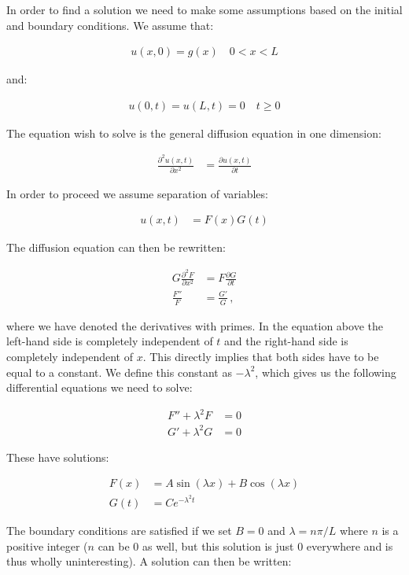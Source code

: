 \documentclass[reprint,english,notitlepage]{revtex4-1}  %
\begin{document}
In order to find a solution we need to make some assumptions based on the initial and boundary conditions. We assume that:

\begin{align*}
u(x,0) = g(x) \quad 0 < x < L
\end{align*}

and:

\begin{align*}
u(0,t) = u(L,t) = 0 \quad t \geq 0
\end{align*}

The equation wish to solve is the general diffusion equation in one dimension:

\begin{align*}
\frac{\partial^2 u(x,t)}{\partial x^2} &= \frac{\partial u(x,t)}{\partial t}
\end{align*}

In order to proceed we assume separation of variables:

\begin{align*}
u(x,t) &= F(x)G(t) 
\end{align*}

The diffusion equation can then be rewritten:

\begin{align*}
G \frac{\partial^2 F}{\partial x^2} &= F \frac{\partial G}{\partial t} \\
\frac{F''}{F} &= \frac{G'}{G} \, ,
\end{align*}

where we have denoted the derivatives with primes. In the equation above the left-hand side is completely independent of $t$ and the right-hand side is completely independent of $x$. This directly implies that both sides have to be equal to a constant. We define this constant as $-\lambda^2$, which gives us the following differential equations we need to solve:

\begin{align*}
F'' + \lambda^2 F &= 0 \\
G' + \lambda^2 G &= 0
\end{align*}

These have solutions:

\begin{align*}
F(x) &= A \sin (\lambda x) + B \cos ( \lambda x) \\
G(t) &= Ce^{-\lambda^2 t}
\end{align*}

The boundary conditions are satisfied if we set $B = 0$ and $\lambda = n\pi /L$ where $n$ is a positive integer ($n$ can be 0 as well, but this solution is just 0 everywhere and is thus wholly uninteresting). A solution can then be written:
\end{document}
